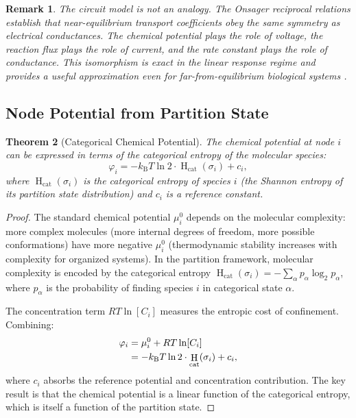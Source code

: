\documentclass[11pt,twocolumn,a4paper]{article}
\newtheorem{theorem}{Theorem}[section]
\newtheorem{remark}[theorem]{Remark}
\newcommand{\kb}{k_{\mathrm{B}}}
\DeclareMathOperator{\Ent}{H}
\begin{document}
\begin{remark}
The circuit model is not an analogy. The Onsager reciprocal relations
\citep{onsager1931} establish that near-equilibrium transport
coefficients obey the same symmetry as electrical conductances. The
chemical potential plays the role of voltage, the reaction flux plays
the role of current, and the rate constant plays the role of
conductance. This isomorphism is exact in the linear response regime
and provides a useful approximation even for far-from-equilibrium
biological systems \citep{degroot1962}.
\end{remark}

\subsection{Node Potential from Partition State}

\begin{theorem}[Categorical Chemical Potential]
\label{thm:categorical-potential}
The chemical potential at node $i$ can be expressed in terms of the
categorical entropy of the molecular species:
\begin{equation}
\varphi_i = -\kb T \ln 2 \cdot \Ent_{\mathrm{cat}}(\sigma_i) + c_i,
\label{eq:categorical-potential}
\end{equation}
where $\Ent_{\mathrm{cat}}(\sigma_i)$ is the categorical entropy of
species $i$ (the Shannon entropy of its partition state distribution)
and $c_i$ is a reference constant.
\end{theorem}

\begin{proof}
The standard chemical potential $\mu_i^0$ depends on the molecular
complexity: more complex molecules (more internal degrees of freedom,
more possible conformations) have more negative $\mu_i^0$
(thermodynamic stability increases with complexity for organized
systems). In the partition framework, molecular complexity is encoded
by the categorical entropy $\Ent_{\mathrm{cat}}(\sigma_i) =
-\sum_\alpha p_\alpha \log_2 p_\alpha$, where $p_\alpha$ is the
probability of finding species $i$ in categorical state $\alpha$.

The concentration term $RT \ln [C_i]$ measures the entropic cost of
confinement. Combining:
\begin{align}
\varphi_i &= \mu_i^0 + RT \ln [C_i] \notag \\
  &= -\kb T \ln 2 \cdot \Ent_{\mathrm{cat}}(\sigma_i) + c_i,
\end{align}
where $c_i$ absorbs the reference potential and concentration
contribution. The key result is that the chemical potential is a linear
function of the categorical entropy, which is itself a function of the
partition state.
\end{proof}
\end{document}
